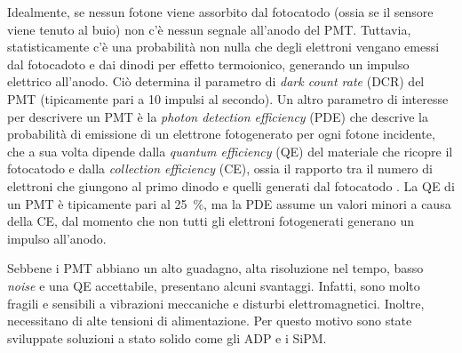 Idealmente, se nessun fotone viene assorbito dal fotocatodo (ossia se il sensore viene tenuto al buio) non c'è nessun segnale all'anodo del PMT. Tuttavia, statisticamente c'è una probabilità non nulla che degli elettroni vengano emessi dal fotocadoto e dai dinodi per effetto termoionico, generando un impulso elettrico all'anodo. Ciò determina il parametro di \textit{dark count rate} (DCR) del PMT (tipicamente pari a 10 impulsi al secondo).
Un altro parametro di interesse per descrivere un PMT è la \textit{photon detection efficiency} (PDE) che descrive la probabilità di emissione di un elettrone fotogenerato per ogni fotone incidente, che a sua volta dipende dalla \textit{quantum efficiency} (QE) del materiale che ricopre il fotocatodo e dalla \textit{collection efficiency} (CE), ossia il rapporto tra il numero di elettroni che giungono al primo dinodo e quelli generati dal fotocatodo \cite{Hai2018}. La QE di un PMT è tipicamente pari al \SI{25}{\percent}, ma la PDE assume un valori minori a causa della CE, dal momento che non tutti gli elettroni fotogenerati generano un impulso all'anodo.

Sebbene i PMT abbiano un alto guadagno, alta risoluzione nel tempo, basso \textit{noise} e una QE accettabile, presentano alcuni svantaggi. Infatti, sono molto fragili e sensibili a vibrazioni meccaniche e disturbi elettromagnetici. Inoltre, necessitano di alte tensioni di alimentazione. Per questo motivo sono state sviluppate soluzioni a stato solido come gli ADP e i SiPM.

\clearpage
